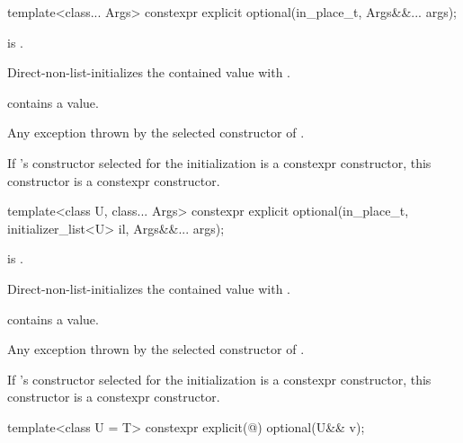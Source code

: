 %
\begin{itemdecl}
template<class... Args> constexpr explicit optional(in_place_t, Args&&... args);
\end{itemdecl}

\begin{itemdescr}
\pnum
\constraints
{} is .

\pnum
\effects
Direct-non-list-initializes the contained value with .

\pnum
\ensures
{} contains a value.

\pnum
\throws
Any exception thrown by the selected constructor of .

\pnum
\remarks
If 's constructor selected for the initialization is a constexpr constructor, this constructor is a constexpr constructor.
\end{itemdescr}

%
\begin{itemdecl}
template<class U, class... Args>
  constexpr explicit optional(in_place_t, initializer_list<U> il, Args&&... args);
\end{itemdecl}

\begin{itemdescr}
\pnum
\constraints
{} is .

\pnum
\effects
Direct-non-list-initializes the contained value with .

\pnum
\ensures
{} contains a value.

\pnum
\throws
Any exception thrown by the selected constructor of .

\pnum
\remarks
If 's constructor selected for the initialization is a constexpr constructor, this constructor is a constexpr constructor.
\end{itemdescr}

%
\begin{itemdecl}
template<class U = T> constexpr explicit(@\seebelow@) optional(U&& v);
\end{itemdecl}

